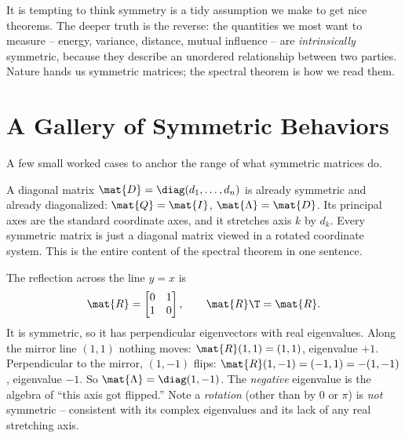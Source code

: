\begin{remark}
\label{ch26:rem-not-convenience}
It is tempting to think symmetry is a tidy assumption we make to get nice theorems.
The deeper truth is the reverse: the quantities we most want to measure -- energy,
variance, distance, mutual influence -- are \emph{intrinsically} symmetric,
because they describe an unordered relationship between two parties. Nature hands
us symmetric matrices; the spectral theorem is how we read them.
\end{remark}

\section{A Gallery of Symmetric Behaviors}
\label{ch26:gallery}

A few small worked cases to anchor the range of what symmetric matrices do.

\begin{example}
\label{ch26:ex-diagonal}
A diagonal matrix $\mat{D}=\diag(d_1,\dots,d_n)$ is already symmetric and already
diagonalized: $\mat{Q}=\mat{I}$, $\mat{\Lambda}=\mat{D}$. Its principal axes are
the standard coordinate axes, and it stretches axis $k$ by $d_k$. Every symmetric
matrix is just a diagonal matrix viewed in a rotated coordinate system. This is
the entire content of the spectral theorem in one sentence.
\end{example}

\begin{example}
\label{ch26:ex-reflection}
The reflection across the line $y=x$ is
\[
  \mat{R} = \begin{bmatrix} 0 & 1 \\ 1 & 0 \end{bmatrix},\qquad \mat{R}\T=\mat{R}.
\]
It is symmetric, so it has perpendicular eigenvectors with real eigenvalues. Along
the mirror line $(1,1)$ nothing moves: $\mat{R}(1,1)=(1,1)$, eigenvalue $+1$.
Perpendicular to the mirror, $(1,-1)$ flips: $\mat{R}(1,-1)=(-1,1)=-(1,-1)$,
eigenvalue $-1$. So $\mat{\Lambda}=\diag(1,-1)$. The \emph{negative} eigenvalue is
the algebra of ``this axis got flipped.'' Note a \emph{rotation} (other than by
$0$ or $\pi$) is \emph{not} symmetric -- consistent with its complex eigenvalues
and its lack of any real stretching axis.
\end{example}

